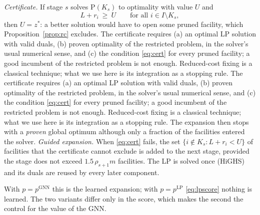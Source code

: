 \noindent\emph{Certificate.} If stage $s$ solves $\mathrm{P}(K_s)$ to optimality with value $U$
and
\begin{equation}\label{eq:cert}
L+r_i\ \ge\ U\qquad\text{for all } i\in I\setminus K_s,
\end{equation}
then $U=z^\ast$: a better solution would have to open some pruned facility, which
Proposition~\ref{prop:rc} excludes. The certificate requires (a) an optimal LP solution with
valid duals, (b) proven optimality of the restricted problem, in the solver's usual numerical
sense, and (c) the condition \eqref{eq:cert} for every pruned facility; a good incumbent of the
restricted problem is not enough. Reduced-cost fixing is a classical technique; what we use here
is its integration as a stopping rule. The certificate requires (a) an optimal LP solution with
valid duals, (b) proven optimality of the restricted problem, in the solver's usual numerical
sense, and (c) the condition \eqref{eq:cert} for every pruned facility; a good incumbent of the
restricted problem is not enough. Reduced-cost fixing is a classical technique; what we use here
is its integration as a stopping rule. The expansion then stops with a \emph{proven} global optimum
although only a fraction of the facilities entered the solver. \emph{Guided expansion.} When
\eqref{eq:cert} fails, the set $\{i\notin K_{s}: L+r_i<U\}$ of facilities that the certificate
cannot exclude is added to the next stage, provided the stage does not exceed $1.5\,\rho_{s+1}m$
facilities. The LP is solved once (HiGHS) and its duals are reused by every later component.

With $p=p^{\mathrm{GNN}}$ this is the learned expansion; with $p=p^{\mathrm{LP}}$
\eqref{eq:lpscore} nothing is learned. The two variants differ only in the score, which makes the
second the control for the value of the GNN.

